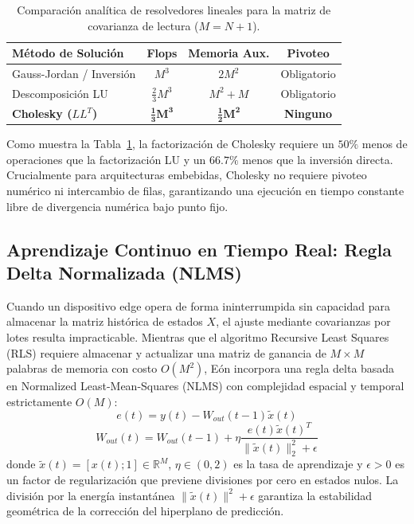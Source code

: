 \documentclass[10pt,twocolumn]{article}
\begin{document}
\begin{table}[h]
\centering
\small
\begin{tabular}{lccc}
\toprule
\textbf{Método de Solución} & \textbf{Flops} & \textbf{Memoria Aux.} & \textbf{Pivoteo} \\
\midrule
Gauss-Jordan / Inversión & $M^3$ & $2 M^2$ & Obligatorio \\
Descomposición LU        & $\frac{2}{3} M^3$ & $M^2 + M$ & Obligatorio \\
\textbf{Cholesky ($L L^T$)} & $\mathbf{\frac{1}{3} M^3}$ & $\mathbf{\frac{1}{2} M^2}$ & \textbf{Ninguno} \\
\bottomrule
\end{tabular}
\caption{Comparación analítica de resolvedores lineales para la matriz de covarianza de lectura ($M=N+1$).}
\label{tab:solver_complexity}
\end{table}

Como muestra la Tabla~\ref{tab:solver_complexity}, la factorización de Cholesky requiere un $50\%$ menos de operaciones que la factorización LU y un $66.7\%$ menos que la inversión directa. Crucialmente para arquitecturas embebidas, Cholesky no requiere pivoteo numérico ni intercambio de filas, garantizando una ejecución en tiempo constante libre de divergencia numérica bajo punto fijo.

\subsection{Aprendizaje Continuo en Tiempo Real: Regla Delta Normalizada (NLMS)}

Cuando un dispositivo edge opera de forma ininterrumpida sin capacidad para almacenar la matriz histórica de estados $X$, el ajuste mediante covarianzas por lotes resulta impracticable. Mientras que el algoritmo Recursive Least Squares (RLS) requiere almacenar y actualizar una matriz de ganancia de $M \times M$ palabras de memoria con costo $O(M^2)$, Eón incorpora una regla delta basada en Normalized Least-Mean-Squares (NLMS) con complejidad espacial y temporal estrictamente $O(M)$:
\begin{equation}
e(t) = y(t) - W_{out}(t-1) \tilde{x}(t)
\end{equation}
\begin{equation}
W_{out}(t) = W_{out}(t-1) + \eta \frac{e(t) \tilde{x}(t)^T}{\|\tilde{x}(t)\|_2^2 + \epsilon}
\end{equation}
donde $\tilde{x}(t) = [x(t); 1] \in \mathbb{R}^M$, $\eta \in (0, 2)$ es la tasa de aprendizaje y $\epsilon > 0$ es un factor de regularización que previene divisiones por cero en estados nulos. La división por la energía instantánea $\|\tilde{x}(t)\|^2 + \epsilon$ garantiza la estabilidad geométrica de la corrección del hiperplano de predicción.
\end{document}

